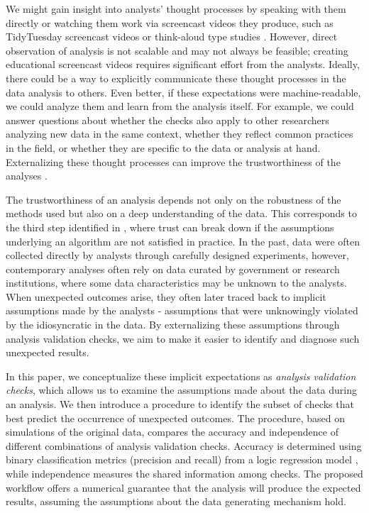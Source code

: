 \documentclass[
  12pt,
]{interact}
\begin{document}
We might gain insight into analysts' thought processes by speaking with
them directly or watching them work via screencast videos they produce,
such as TidyTuesday screencast videos or think-aloud type studies
\citep[e.g.][]{gu2024data}. However, direct observation of analysis is
not scalable and may not always be feasible; creating educational
screencast videos requires significant effort from the analysts.
Ideally, there could be a way to explicitly communicate these thought
processes in the data analysis to others. Even better, if these
expectations were machine-readable, we could analyze them and learn from
the analysis itself. For example, we could answer questions about
whether the checks also apply to other researchers analyzing new data in
the same context, whether they reflect common practices in the field, or
whether they are specific to the data or analysis at hand. Externalizing
these thought processes can improve the trustworthiness of the analyses
\citep{yu2024veridical}.

The trustworthiness of an analysis depends not only on the robustness of
the methods used but also on a deep understanding of the data. This
corresponds to the third step identified in
\citet{broderick_toward_2023}, where trust can break down if the
assumptions underlying an algorithm are not satisfied in practice. In
the past, data were often collected directly by analysts through
carefully designed experiments, however, contemporary analyses often
rely on data curated by government or research institutions, where some
data characteristics may be unknown to the analysts. When unexpected
outcomes arise, they often later traced back to implicit assumptions
made by the analysts - assumptions that were unknowingly violated by the
idiosyncratic in the data. By externalizing these assumptions through
analysis validation checks, we aim to make it easier to identify and
diagnose such unexpected results.

In this paper, we conceptualize these implicit expectations as
\emph{analysis validation checks}, which allows us to examine the
assumptions made about the data during an analysis. We then introduce a
procedure to identify the subset of checks that best predict the
occurrence of unexpected outcomes. The procedure, based on simulations
of the original data, compares the accuracy and independence of
different combinations of analysis validation checks. Accuracy is
determined using binary classification metrics (precision and recall)
from a logic regression model \citep{ruczinski_logic_2003}, while
independence measures the shared information among checks. The proposed
workflow offers a numerical guarantee that the analysis will produce the
expected results, assuming the assumptions about the data generating
mechanism hold.
\end{document}

